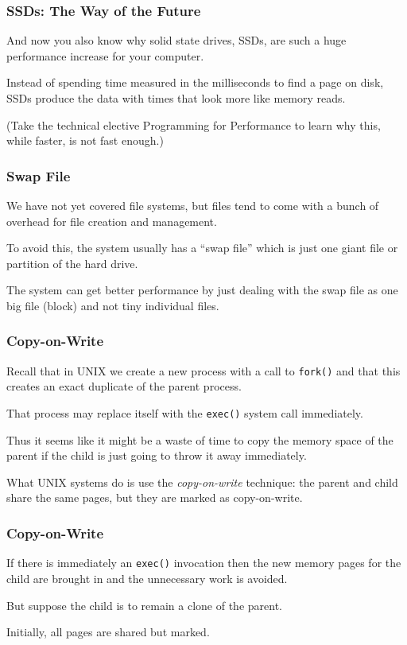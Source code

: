 \begin{frame}
\frametitle{SSDs: The Way of the Future}

And now you also know why solid state drives, SSDs, are such a huge performance increase for your computer. 

Instead of spending time measured in the milliseconds to find a page on disk, SSDs produce the data with times that look more like memory reads.

(Take the technical elective Programming for Performance to learn why this, while faster, is not fast enough.)


\end{frame}

\begin{frame}
\frametitle{Swap File}

We have not yet covered file systems, but files tend to come with a bunch of overhead for file creation and management. 

To avoid this, the system usually has a ``swap file'' which is just one giant file or partition of the hard drive. 

The system can get better performance by just dealing with the swap file as one big file (block) and not tiny individual files.



\end{frame}

\begin{frame}
\frametitle{Copy-on-Write}

Recall that in UNIX we create a new process with a call to \texttt{fork()} and that this creates an exact duplicate of the parent process. 

That process may replace itself with the \texttt{exec()} system call immediately. 

Thus it seems like it might be a waste of time to copy the memory space of the parent if the child is just going to throw it away immediately. 

What UNIX systems do is use the \textit{copy-on-write} technique: the parent and child share the same pages, but they are marked as copy-on-write.

\end{frame}

\begin{frame}
\frametitle{Copy-on-Write}

If there is immediately an \texttt{exec()} invocation then the new memory pages for the child are brought in and the unnecessary work is avoided. 

But suppose the child is to remain a clone of the parent.

Initially, all pages are shared but marked. 

\end{frame}

